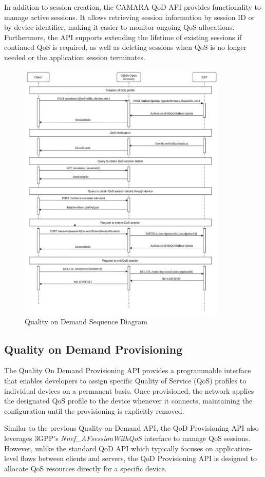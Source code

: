 In addition to session creation, the CAMARA QoD API provides functionality to manage active sessions. It allows retrieving session information by session ID or by device identifier, making it easier to monitor ongoing QoS allocations. Furthermore, the API supports extending the lifetime of existing sessions if continued QoS is required, as well as deleting sessions when QoS is no longer needed or the application session terminates.

\begin{figure}[H]
	\centerline{
		\includegraphics[width=10cm]{figs/QoD_sequence_diagram.png}
	}
	\caption{Quality on Demand Sequence Diagram}
\end{figure}

\subsection{Quality on Demand Provisioning}

The Quality On Demand Provisioning API provides a programmable interface that enables developers to assign specific Quality of Service (QoS) profiles to individual devices on a permanent basis. Once provisioned, the network applies the designated QoS profile to the device whenever it connects, maintaining the configuration until the provisioning is explicitly removed.

Similar to the previous Quality-on-Demand API, the QoD Provisioning API also leverages 3GPP’s \emph{Nnef\_AFsessionWithQoS} interface to manage QoS sessions. However, unlike the standard QoD API which typically focuses on application-level flows between clients and servers, the QoD Provisioning API is designed to allocate QoS resources directly for a specific device.

